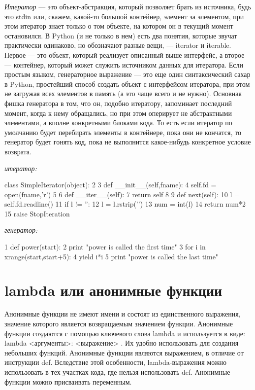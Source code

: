 \textit{Итератор} — это объект-абстракция, который позволяет брать из источника, будь это stdin или, скажем, какой-то большой контейнер, элемент за элементом, при этом итератор знает только о том объекте, на котором он в текущий момент остановился.
В Python (и не только в нем) есть два понятия, которые звучат практически одинаково, но обозначают разные вещи, — iterator и iterable. Первое — это объект, который реализует описанный выше интерфейс, а второе — контейнер, который может служить источником данных для итератора.
Если простым языком, генераторное выражение — это еще один синтаксический сахар в Python, простейший способ создать объект с интерфейсом итератора, при этом не загружая всех элементов в память (а это чаще всего и не нужно).
Основная фишка генератора в том, что он, подобно итератору, запоминает последний момент, когда к нему обращались, но при этом оперирует не абстрактными элементами, а вполне конкретными блоками кода. То есть если итератор по умолчанию будет перебирать элементы в контейнере, пока они не кончатся, то генератор будет гонять код, пока не выполнится какое-нибудь конкретное условие возврата. 

\textit{итератор:}
\begin{python}
class SimpleIterator(object):
 2     
 3     def __init__(self,fname):
 4         self.fd = open(fname,'r')
 5         
 6     def __iter__(self):
 7         return self
 8 
 9     def next(self):
10         l = self.fd.readline()
11         if l != '':
12             l = l.rstrip('\n')
13             num = int(l)
14             return num*2
15         raise StopIteration
\end{python}

\textit{генератор:}
\begin{python}
1 def power(start):
2     print "power is called the first time"
3     for i in xrange(start,start+5):
4         yield i*i
5     print "power is called the last time"
\end{python}

\section{lambda или анонимные функции}		

Анонимные функции не имеют имени и состоят из единственного выражения, значение которого является возвращаемым значением функции. Анонимные функции создаются с помощью ключевого слова lambda и используется в виде: lambda <аргументы>: <выражение> . Их удобно использовать для создания небольших функций. Анонимные функции являются выражением, в отличие от инструкции def. Вследствие этой особенности, lambda-выражения можно использовать в тех участках кода, где нельзя использовать def. Анонимные функции можно присваивать переменным.

